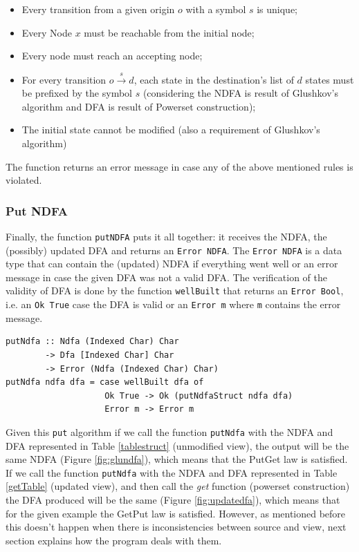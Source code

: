 \begin{itemize}
    \item Every transition from a given origin $o$ with a symbol $s$ is unique;
    \item Every Node $x$ must be reachable from the initial node;
    \item Every node must reach an accepting node;
    \item For every transition $o \xrightarrow{s} d $, each state in the destination's list of $d$ states must be prefixed by the symbol $s$ (considering the NDFA is result of Glushkov's algorithm and DFA is result of Powerset construction);
    \item The initial state cannot be modified (also a requirement of Glushkov's algorithm)
\end{itemize}

The function returns an error message in case any of the above mentioned rules is violated. 

\subsubsection{Put NDFA}
Finally, the function \texttt{putNDFA} puts it all together: it receives the NDFA, the (possibly) updated DFA and returns an \texttt{Error NDFA}. The \texttt{Error NDFA} is a data type that can contain the (updated) NDFA if everything went well or an error message in case the given DFA was not a valid DFA. The verification of the validity of DFA is done by the function \texttt{wellBuilt} that returns an \texttt{Error Bool}, i.e. an \texttt{Ok True} case the DFA is valid or an \texttt{Error m} where \texttt{m} contains the error message.

\vspace{5mm}
\begin{verbatim}
putNdfa :: Ndfa (Indexed Char) Char 
        -> Dfa [Indexed Char] Char
        -> Error (Ndfa (Indexed Char) Char)
putNdfa ndfa dfa = case wellBuilt dfa of 
                    Ok True -> Ok (putNdfaStruct ndfa dfa)
                    Error m -> Error m
\end{verbatim}


Given this \texttt{put} algorithm if we call the function \texttt{putNdfa} with the NDFA and DFA represented in Table \ref{tablestruct} (unmodified view), the output will be the same NDFA (Figure \ref{fig:glundfa}), which means that the PutGet law is satisfied. 
If we call the function \texttt{putNdfa} with the NDFA and DFA represented in Table \ref{getTable} (updated view), and then call the \textit{get} function (powerset construction) the DFA produced will be the same (Figure \ref{fig:updatedfa}), which means that for the given example the GetPut law is satisfied. However, as mentioned before this doesn't happen when there is inconsistencies between source and view, next section explains how the program deals with them.  


